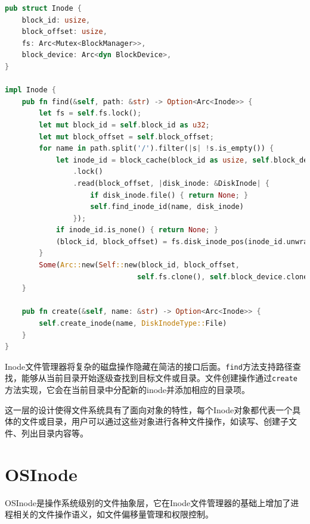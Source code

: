 \begin{lstlisting}[language=Rust]
pub struct Inode {
    block_id: usize,
    block_offset: usize,
    fs: Arc<Mutex<BlockManager>>,
    block_device: Arc<dyn BlockDevice>,
}

impl Inode {
    pub fn find(&self, path: &str) -> Option<Arc<Inode>> {
        let fs = self.fs.lock();
        let mut block_id = self.block_id as u32;
        let mut block_offset = self.block_offset;
        for name in path.split('/').filter(|s| !s.is_empty()) {
            let inode_id = block_cache(block_id as usize, self.block_device.clone())
                .lock()
                .read(block_offset, |disk_inode: &DiskInode| {
                    if disk_inode.file() { return None; }
                    self.find_inode_id(name, disk_inode)
                });
            if inode_id.is_none() { return None; }
            (block_id, block_offset) = fs.disk_inode_pos(inode_id.unwrap());
        }
        Some(Arc::new(Self::new(block_id, block_offset, 
                               self.fs.clone(), self.block_device.clone())))
    }

    pub fn create(&self, name: &str) -> Option<Arc<Inode>> {
        self.create_inode(name, DiskInodeType::File)
    }
}
\end{lstlisting}

Inode文件管理器将复杂的磁盘操作隐藏在简洁的接口后面。\texttt{find}方法支持路径查找，能够从当前目录开始逐级查找到目标文件或目录。文件创建操作通过\texttt{create}方法实现，它会在当前目录中分配新的inode并添加相应的目录项。

这一层的设计使得文件系统具有了面向对象的特性，每个Inode对象都代表一个具体的文件或目录，用户可以通过这些对象进行各种文件操作，如读写、创建子文件、列出目录内容等。

\section{OSInode}

OSInode是操作系统级别的文件抽象层，它在Inode文件管理器的基础上增加了进程相关的文件操作语义，如文件偏移量管理和权限控制。

